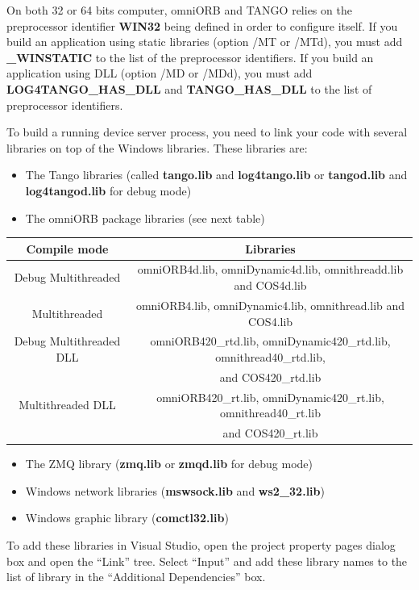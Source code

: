 On both 32 or 64 bits computer, omniORB and TANGO relies on the preprocessor
identifier \textbf{WIN32} being defined in order to
configure itself. If you build an application using static libraries
(option /MT or /MTd), you must add \textbf{\_WINSTATIC} to the list
of the preprocessor identifiers. If you build an application using
DLL (option /MD or /MDd), you must add \textbf{LOG4TANGO\_HAS\_DLL}
and \textbf{TANGO\_HAS\_DLL} to the list of preprocessor identifiers.

To build a running device server process, you need to link your code
with several libraries on top of the Windows libraries. These libraries
are:
\begin{itemize}
\item The Tango libraries (called \textbf{tango.lib} and \textbf{log4tango.lib}
or \textbf{tangod.lib} and \textbf{log4tangod.lib} for debug mode)
\item The omniORB package libraries (see next table)\\

\end{itemize}
\begin{center}
\begin{longtable}{|c|c|}
\hline 
Compile mode & Libraries\tabularnewline
\hline 
\hline 
Debug Multithreaded & omniORB4d.lib, omniDynamic4d.lib, omnithreadd.lib and COS4d.lib\tabularnewline
\hline 
Multithreaded & omniORB4.lib, omniDynamic4.lib, omnithread.lib and COS4.lib\tabularnewline
\hline 
Debug Multithreaded DLL & omniORB420\_rtd.lib, omniDynamic420\_rtd.lib, omnithread40\_rtd.lib,\tabularnewline
 & and COS420\_rtd.lib\tabularnewline
\hline 
Multithreaded DLL & omniORB420\_rt.lib, omniDynamic420\_rt.lib, omnithread40\_rt.lib\tabularnewline
 & and COS420\_rt.lib\tabularnewline
\hline 
\end{longtable}
\par\end{center}
\begin{itemize}
\item The ZMQ library (\textbf{zmq.lib} or \textbf{zmqd.lib} for debug mode)
\item Windows network libraries (\textbf{mswsock.lib} and \textbf{ws2\_32.lib})
\item Windows graphic library (\textbf{comctl32.lib})
\end{itemize}
To add these libraries in Visual Studio, open the project property
pages dialog box and open the ``Link'' tree. Select ``Input''
and add these library names to the list of library in the ``Additional
Dependencies'' box. 

